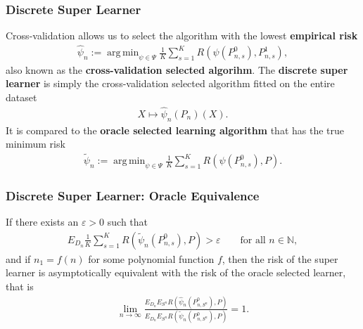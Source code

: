 \documentclass{beamer}
\DeclareMathOperator*{\argmin}{arg\,min}
\newcommand{\la}{\psi}
\newcommand{\Sn}{S^n}
\newcommand{\lib}{\Psi}
\begin{document}
\begin{frame}
\frametitle{Discrete Super Learner}
Cross-validation allows us to select the algorithm with the lowest \textbf{empirical risk
}
\begin{align*}
    \hat{\la}_n := \argmin_{\la \in \lib} \frac{1}{K} \sum_{s = 1}^{K} R(\la(P_{n, s}^{0}) , P_{n, s}^{1}),  
\end{align*}
also known as the \textbf{cross-validation selected algorihm}. The \textbf{discrete super learner} is simply the cross-validation selected algorithm fitted on the entire dataset 
\begin{align*}
    X \mapsto \hat{\la}_n(P_n)(X).
\end{align*}
It is compared to the \textbf{oracle selected learning algorithm} that has the true minimum risk
\begin{align*}
    \tilde{\la}_n := \argmin_{\la \in \lib} \frac{1}{K} \sum_{s = 1}^{K} R(\la(P_{n, s}^{0}) , P).  
\end{align*}

\end{frame}

\begin{frame}
    \frametitle{Discrete Super Learner: Oracle Equivalence}
\begin{corollary} \label{cor:dslasymptoticequivalence}
    If there exists an $ \varepsilon > 0 $ such that 
   \begin{align*}
       E_{D_n} \frac{1}{K} \sum_{s = 1}^{K} R(\tilde{\la}_n(P_{n, s}^{0}), P) > \varepsilon \qquad \text{for all } n \in \mathbb{N},
   \end{align*}
   and if $ n_1 = f(n) $ for some polynomial function $ f $, then the risk of the super learner is asymptotically equivalent with the risk of the oracle selected learner, that is
   \begin{align*}
       \lim_{n \to \infty} \frac{E_{D_n} E_{\Sn} R(\hat{\la}_n(P_{n, \Sn}^{0}), P)}{E_{D_n} E_{\Sn} R(\tilde{\la}_n(P_{n, \Sn}^{0}), P)} = 1.
   \end{align*}
\end{corollary}
\end{frame}
\end{document}
